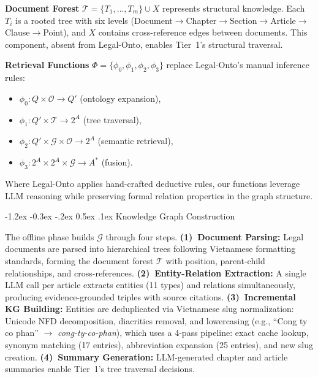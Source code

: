 \documentclass{IOS-Book-Article}
\makeatletter
\renewcommand\subsection{\@startsection{subsection}{2}{\z@}%
  {-1.2ex \@plus -0.3ex \@minus -.2ex}%
  {0.5ex \@plus .1ex}%
  {\normalfont\normalsize\bfseries}}
\makeatother
\begin{document}
\textbf{Document Forest} $\mathcal{T} = \{T_1, \ldots, T_m\} \cup X$ represents structural knowledge. Each $T_i$ is a rooted tree with six levels (Document${}\to{}$\allowbreak Chapter${}\to{}$\allowbreak Section${}\to{}$\allowbreak Article${}\to{}$\allowbreak Clause${}\to{}$\allowbreak Point), and $X$ contains cross-reference edges between documents. This component, absent from Legal-Onto, enables Tier~1's structural traversal.

\textbf{Retrieval Functions} $\Phi = \{\phi_0, \phi_1, \phi_2, \phi_3\}$ replace Legal-Onto's manual inference rules:
\begin{itemize}[nosep,leftmargin=1.5em]
\item $\phi_0\colon Q \times \mathcal{O} \to Q'$ (ontology expansion),
\item $\phi_1\colon Q' \times \mathcal{T} \to 2^A$ (tree traversal),
\item $\phi_2\colon Q' \times \mathcal{G} \times \mathcal{O} \to 2^A$ (semantic retrieval),
\item $\phi_3\colon 2^A \times 2^A \times \mathcal{G} \to A^*$ (fusion).
\end{itemize}
Where Legal-Onto applies hand-crafted deductive rules, our functions leverage LLM reasoning while preserving formal relation properties in the graph structure.

\subsection{Knowledge Graph Construction}

The offline phase builds $\mathcal{G}$ through four steps. \textbf{(1)~Document Parsing:} Legal documents are parsed into hierarchical trees following Vietnamese formatting standards, forming the document forest $\mathcal{T}$ with position, parent-child relationships, and cross-references. \textbf{(2)~Entity-Relation Extraction:} A single LLM call per article extracts entities (11 types) and relations simultaneously, producing evidence-grounded triples with source citations. \textbf{(3)~Incremental KG Building:} Entities are deduplicated via Vietnamese slug normalization: Unicode NFD decomposition, diacritics removal, and lowercasing (e.g., ``Cong ty co phan'' $\to$ \textit{cong-ty-co-phan}), which uses a 4-pass pipeline: exact cache lookup, synonym matching (17 entries), abbreviation expansion (25 entries), and new slug creation. \textbf{(4)~Summary Generation:} LLM-generated chapter and article summaries enable Tier~1's tree traversal decisions.
\end{document}
